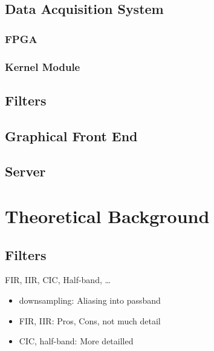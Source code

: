 \documentclass[a4paper,oneside]{alpenthesis/alpenthesis}
\begin{document}
\chapter{Data Acquisition System}
\section{FPGA}
\section{Kernel Module}

\chapter{Filters}
\chapter{Graphical Front End}
\chapter{Server}

\part{Theoretical Background}
\chapter{Filters}
FIR, IIR, CIC, Half-band, \ldots
\begin{itemize}
    \item downsampling: Aliasing into passband
    \item FIR, IIR: Pros, Cons, not much detail
    \item CIC, half-band: More detailled
\end{itemize}
\end{document}
